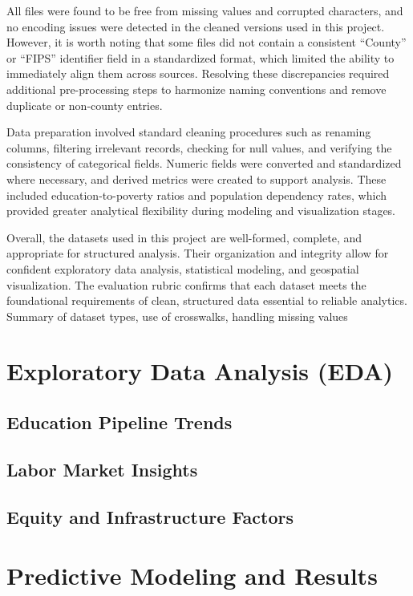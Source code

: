 \documentclass[12pt]{llncs}
\begin{document}
All files were found to be free from missing values and corrupted characters, and no encoding issues were detected in the cleaned versions used in this project. However, it is worth noting that some files did not contain a consistent “County” or “FIPS” identifier field in a standardized format, which limited the ability to immediately align them across sources. Resolving these discrepancies required additional pre-processing steps to harmonize naming conventions and remove duplicate or non-county entries.

Data preparation involved standard cleaning procedures such as renaming columns, filtering irrelevant records, checking for null values, and verifying the consistency of categorical fields. Numeric fields were converted and standardized where necessary, and derived metrics were created to support analysis. These included education-to-poverty ratios and population dependency rates, which provided greater analytical flexibility during modeling and visualization stages.

Overall, the datasets used in this project are well-formed, complete, and appropriate for structured analysis. Their organization and integrity allow for confident exploratory data analysis, statistical modeling, and geospatial visualization. The evaluation rubric confirms that each dataset meets the foundational requirements of clean, structured data essential to reliable analytics.
Summary of dataset types, use of crosswalks, handling missing values

\section{Exploratory Data Analysis (EDA)}
\subsection{Education Pipeline Trends}

\subsection{Labor Market Insights}

\subsection{Equity and Infrastructure Factors}


\section{Predictive Modeling and Results}
\end{document}
